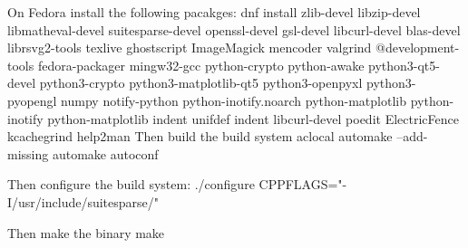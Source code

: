 On Fedora install the following pacakges:\newline
dnf install zlib-devel libzip-devel libmatheval-devel suitesparse-devel openssl-devel gsl-devel libcurl-devel blas-devel librsvg2-tools texlive ghostscript ImageMagick mencoder valgrind @development-tools fedora-packager mingw32-gcc python-crypto python-awake python3-qt5-devel python3-crypto python3-matplotlib-qt5 python3-openpyxl python3-pyopengl numpy notify-python python-inotify.noarch python-matplotlib python-inotify python-matplotlib indent unifdef indent libcurl-devel poedit ElectricFence kcachegrind help2man\newline
\newline
Then build the build system\newline
aclocal\newline
automake --add-missing\newline
automake\newline
autoconf\newline

Then configure the build system:\newline
./configure CPPFLAGS="-I/usr/include/suitesparse/"\newline

Then make the binary\newline
make\newline

